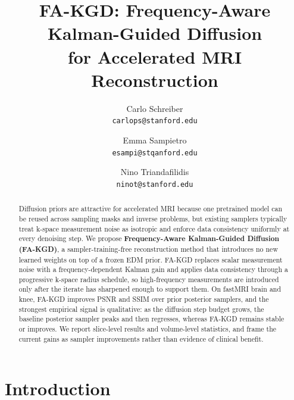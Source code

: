 \documentclass[10pt,twocolumn,letterpaper]{article}
\begin{document}
\title{FA-KGD: Frequency-Aware Kalman-Guided Diffusion\\
for Accelerated MRI Reconstruction}

\author{Carlo Schreiber\\
{\tt\small carlops@stanford.edu}
\and
Emma Sampietro\\
{\tt\small esampi@stqanford.edu}
\and
Nino Triandafilidis\\
{\tt\small ninot@stanford.edu}
}

\maketitle
\thispagestyle{empty}

\begin{abstract}
Diffusion priors are attractive for accelerated MRI because one pretrained
model can be reused across sampling masks and inverse problems, but existing
samplers typically treat k-space measurement noise as isotropic and enforce
data consistency uniformly at every denoising step. We propose
\textbf{Frequency-Aware Kalman-Guided Diffusion (FA-KGD)}, a
sampler-training-free reconstruction method that introduces no new learned
weights on top of a frozen EDM prior. FA-KGD replaces scalar measurement noise
with a frequency-dependent Kalman gain and applies data consistency through a
progressive k-space radius schedule, so high-frequency measurements are
introduced only after the iterate has sharpened enough to support them. On
fastMRI brain and knee, FA-KGD improves PSNR and SSIM over prior posterior
samplers, and the strongest empirical signal is qualitative: as the diffusion
step budget grows, the baseline posterior sampler peaks and then regresses,
whereas FA-KGD remains stable or improves. We report slice-level results and
volume-level statistics, and frame the current gains as sampler improvements
rather than evidence of clinical benefit.
\end{abstract}

\section{Introduction}
\label{sec:intro}
\end{document}
